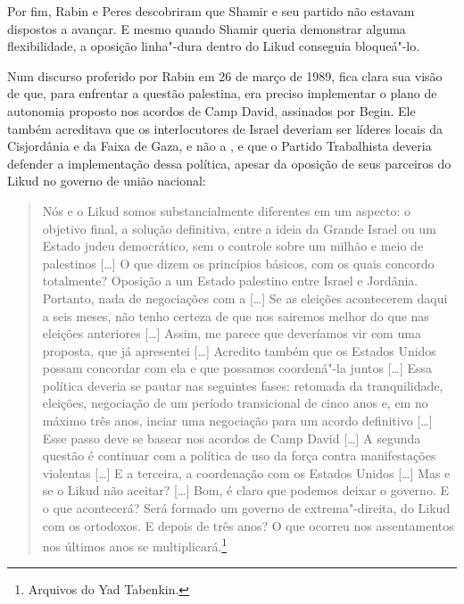 Por fim, Rabin e Peres descobriram que Shamir e seu partido não estavam
dispostos a avançar. E mesmo quando Shamir queria demonstrar alguma
flexibilidade, a oposição linha"-dura dentro do Likud conseguia
bloqueá"-lo.

Num discurso proferido por Rabin em 26 de março de 1989, fica clara sua
visão de que, para enfrentar a questão palestina, era preciso implementar
o plano de autonomia proposto nos acordos de Camp David, assinados por
Begin. Ele também acreditava que os interlocutores de Israel deveriam
ser líderes locais da Cisjordânia e da Faixa de Gaza, e não a , e que
o Partido Trabalhista deveria defender a implementação dessa política,
apesar da oposição de seus parceiros do Likud no governo de união
nacional:

\begin{quote}
Nós e o Likud somos substancialmente diferentes em um aspecto: o
objetivo final, a solução definitiva, entre a ideia da Grande Israel ou
um Estado judeu democrático, sem o controle sobre um milhão e meio de
palestinos {[}\ldots{}{]} O que dizem os princípios básicos, com os quais concordo
totalmente? Oposição a um Estado palestino entre Israel e Jordânia.
Portanto, nada de negociações com a  {[}\ldots{}{]} Se as eleições acontecerem
daqui a seis meses, não tenho certeza de que nos sairemos melhor do que
nas eleições anteriores {[}\ldots{}{]} Assim, me parece que deveríamos vir com uma
proposta, que já apresentei {[}\ldots{}{]} Acredito também que os Estados Unidos
possam concordar com ela e que possamos coordená"-la juntos {[}\ldots{}{]} Essa
política deveria se pautar nas seguintes fases: retomada da
tranquilidade, eleições, negociação de um período transicional de cinco
anos e, em no máximo três anos, inciar uma negociação para um acordo
definitivo {[}\ldots{}{]} Esse passo deve se basear nos acordos de Camp David
{[}\ldots{}{]} A
segunda questão é continuar com a política de uso da força contra
manifestações violentas {[}\ldots{}{]} E a terceira, a coordenação com os Estados
Unidos {[}\ldots{}{]} Mas e se o Likud não aceitar? {[}\ldots{}{]} Bom, é claro que podemos
deixar o governo. E o que acontecerá? Será formado um governo de
extrema"-direita, do Likud com os ortodoxos. E depois de três anos? O que
ocorreu nos assentamentos nos últimos anos se multiplicará.\footnote{Arquivos do
  Yad Tabenkin.}
\end{quote}

